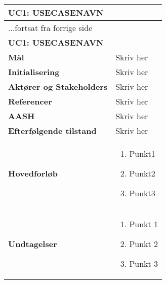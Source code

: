 \begin{center} \centering \label{kravspec:uc1}
	\begin{longtable}{|p{5cm}|p{9cm}|}  %
	\hline
		\multicolumn{2}{|l|}{\textbf{UC1: USECASENAVN}} \\\hline %
		\endfirsthead
		
		\multicolumn{2}{l}{...fortsat fra forrige side} \\ \hline %
		\multicolumn{2}{|l|}{\textbf{UC1: USECASENAVN}} \\\hline %
		\endhead	
		
		\textbf{Mål}							&Skriv her		\\\hline
		\textbf{Initialisering}				&Skriv her		\\\hline
		\textbf{Aktører og Stakeholders}		&Skriv her		\\\hline 
		\textbf{Referencer}					&Skriv her		\\\hline
		\textbf{AASH}						&Skriv her		\\\hline
		\textbf{Efterfølgende tilstand}		&Skriv her		\\\hline
		\textbf{Hovedforløb}					
			&\begin{enumerate}
	
				\item Punkt1
				
				\item Punkt2				
				
				\item Punkt3
				
			\end{enumerate}
		\\\hline
		\textbf{Undtagelser}
			&\begin{enumerate}
			
				\item Punkt 1

				\item Punkt 2
				
				\item Punkt 3

			\end{enumerate}
		\\\hline
	\end{longtable} 
\end{center}

